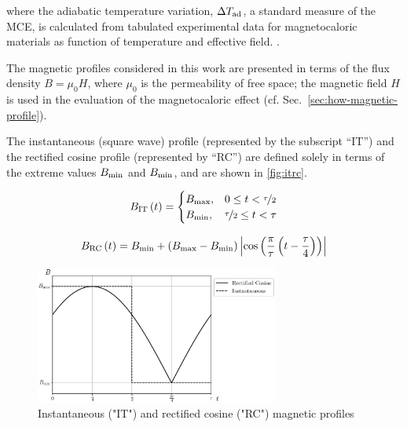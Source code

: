 \documentclass[referee]{svjour3}
\begin{document}

\noindent where the adiabatic temperature variation, $\Delta{}T_{\mathrm{ad}}$, a standard measure of the MCE, is calculated from tabulated experimental data for magnetocaloric materials as function of temperature and effective field. \cite{bib:trevizoli16_perfor_model}.

The magnetic profiles considered in this work are presented in terms of the flux density $B = \mu_0 H$, where $\mu_0$ is the permeability of free space; the magnetic field $H$ is used in the evaluation of the magnetocaloric effect (cf. Sec.~\ref{sec:how-magnetic-profile}).



The instantaneous (square wave) profile (represented by the subscript ``IT'') and the rectified cosine profile (represented by ``RC'') are defined solely in terms of the extreme values $B_{\mathrm{min}}$ and $B_{\mathrm{min}}$, and are shown in \autoref{fig:itrc}.


\begin{equation}
{B}_{\mathrm{IT}}\,(t)=
\begin{cases}
{B}_{\mathrm{max}}, & 0 \le t < \nicefrac{\tau}{2} \\
{B}_{\mathrm{min}}, & \nicefrac{\tau}{2} \le t < \tau\\
\end{cases}
\label{eq:199}
\end{equation}

\begin{equation}
{B}_{\mathrm{RC}}\,(t) = B_{\mathrm{min}} + \left(B_{\mathrm{max}} - B_{\mathrm{min}}\right)  \left\lvert \cos\left( \frac{\pi}{\tau} \left( t - \frac{\tau}{4}\right)\right) \right\rvert
\label{eq:200}
\end{equation}

\begin{figure}[!ht]
  \centering
  \includegraphics[width=8cm]{Fig3-profiles_it_and_rc}
  \caption{Instantaneous ("IT") and rectified cosine ("RC") magnetic profiles}
  \label{fig:itrc}
\end{figure}
\end{document}
